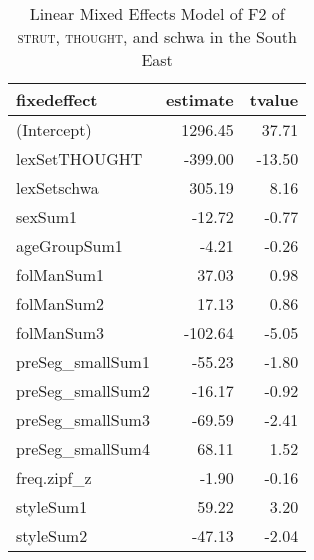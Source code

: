 \begin{table}[ht]
\centering
\begin{tabular}{lrr}
  \hline
fixedeffect & estimate & tvalue \\ 
  \hline
(Intercept) & 1296.45 & 37.71 \\ 
  lexSetTHOUGHT & -399.00 & -13.50 \\ 
  lexSetschwa & 305.19 & 8.16 \\ 
  sexSum1 & -12.72 & -0.77 \\ 
  ageGroupSum1 & -4.21 & -0.26 \\ 
  folManSum1 & 37.03 & 0.98 \\ 
  folManSum2 & 17.13 & 0.86 \\ 
  folManSum3 & -102.64 & -5.05 \\ 
  preSeg\_smallSum1 & -55.23 & -1.80 \\ 
  preSeg\_smallSum2 & -16.17 & -0.92 \\ 
  preSeg\_smallSum3 & -69.59 & -2.41 \\ 
  preSeg\_smallSum4 & 68.11 & 1.52 \\ 
  freq.zipf\_z & -1.90 & -0.16 \\ 
  styleSum1 & 59.22 & 3.20 \\ 
  styleSum2 & -47.13 & -2.04 \\ 
   \hline
\end{tabular}
\caption{Linear Mixed Effects Model of F2 of \textsc{strut}, \textsc{thought}, and schwa in the South East \label{tbl:STF2SE}} 
\end{table}
